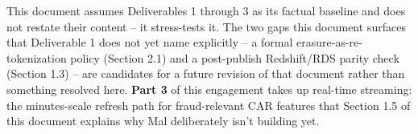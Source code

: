 \documentclass[11pt]{article}
\begin{document}
\begin{note}
This document assumes Deliverables 1 through 3 as its factual baseline and does not restate their content -- it stress-tests it. The two gaps this document surfaces that Deliverable 1 does not yet name explicitly -- a formal erasure-as-re-tokenization policy (Section 2.1) and a post-publish Redshift/RDS parity check (Section 1.3) -- are candidates for a future revision of that document rather than something resolved here. \textbf{Part 3} of this engagement takes up real-time streaming: the minutes-scale refresh path for fraud-relevant CAR features that Section 1.5 of this document explains why Mal deliberately isn't building yet.
\end{note}
\end{document}
